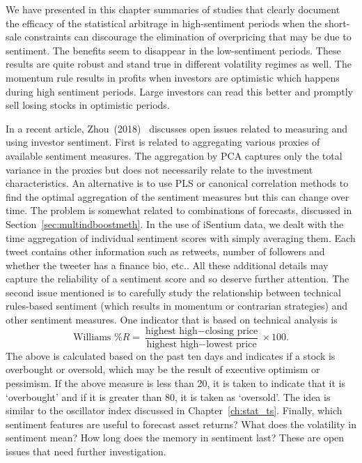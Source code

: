 We have presented in this chapter summaries of studies that clearly document the efficacy of the statistical arbitrage in high-sentiment periods when the short-sale constraints can discourage the elimination of overpricing that may be due to sentiment. The benefits seem to disappear in the low-sentiment periods. These results are quite robust and stand true in different volatility regimes as well. The momentum rule results in profits when investors are optimistic which happens during high sentiment periods. Large investors can read this better and promptly sell losing stocks in optimistic periods.


In a recent article, Zhou~(2018)~\cite{zhou18measure} discusses open issues related to measuring and using investor sentiment. First is related to aggregating various proxies of available sentiment measures. The aggregation by PCA captures only the total variance in the proxies but does not necessarily relate to the investment characteristics. An alternative is to use PLS or canonical correlation methods to find the optimal aggregation of the sentiment measures but this can change over time. The problem is somewhat related to combinations of forecasts, discussed in Section~\ref{sec:multindboostmeth}. In the use of iSentium data, we dealt with the time aggregation of individual sentiment scores with simply averaging them. Each tweet contains other information such as retweets, number of followers and whether the tweeter has a finance bio, etc.. All these additional details may capture the reliability of a sentiment score and so deserve further attention. The second issue mentioned is to carefully study the relationship between technical rules-based sentiment (which results in momentum or contrarian strategies) and other sentiment measures. One indicator that is based on technical analysis is
	\begin{equation}\label{eqn:williams}
	\text{Williams \% }R= \dfrac{\text{highest high}-\text{closing price}}{\text{highest high}-\text{lowest price}} \times 100.
	\end{equation}
The above is calculated based on the past ten days and indicates if a stock is overbought or oversold, which may be the result of executive optimism or pessimism. If the above measure is less than 20, it is taken to indicate that it is `overbought' and if it is greater than 80, it is taken as `oversold'. The idea is similar to the oscillator index discussed in Chapter~\ref{ch:stat_ts}. Finally, which sentiment features are useful to forecast asset returns? What does the volatility in sentiment mean? How long does the memory in sentiment last? These are open issues that need further investigation. 


